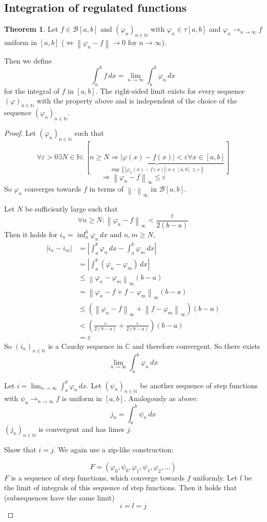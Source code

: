 \documentclass[a4paper,landscape,twocolumn]{article}
\theoremstyle{definition}
\newtheorem{theorem}{Theorem}
\newcommand\set[1]{\left\{#1\right\}}
\newcommand\abs[1]{\left|#1\right|}
\newcommand\seq[1]{{\left(#1\right)}_{n \in \mathbb N}}
\newcommand\reg{\mathcal B}
\newcommand\norm[1]{\left\|#1\right\|}
\begin{document}
\subsection{Integration of regulated functions}
%
\begin{theorem}
  Let $f \in \reg[a,b]$ and $\seq{\varphi_n}$ with $\varphi_n \in \tau[a,b]$ and $\varphi_n \to_{n\to\infty} f$
  uniform in $[a,b]$ ($\Leftrightarrow \norm{\varphi_n - f} \to 0$ for $n \to \infty$).

  Then we define
  \[ \int_a^b f\, dx = \lim_{n\to\infty} \int_a^b \varphi_n \, dx \]
  for the integral of $f$ in $[a,b]$.
  The right-sided limit exists for every sequence $\seq{\varphi}$ with the property above
  and is independent of the choice of the sequence $\seq{\varphi_n}$.
\end{theorem}
\begin{proof}
  Let $\seq{\varphi_n}$ such that
  \[
    \forall \varepsilon > 0 \exists N \in \mathbb N:
    [\underbrace{n \geq N \Rightarrow \abs{\varphi(x) - f(x)} < \varepsilon \forall x \in [a,b]}_{\sup\set{\abs{\varphi_n(x) - f(x)}: x \in [a,b] \leq \varepsilon}}]
  \] \[
    \Rightarrow \norm{\varphi_n - f}_\infty \leq \varepsilon
  \]
  So $\varphi_n$ converges towards $f$ in terms of $\norm{\cdot}_\infty$ in $\reg[a,b]$.

  Let $N$ be sufficiently large such that
  \[ \forall n \geq N: \norm{\varphi_n - f}_\infty < \frac\varepsilon{2(b-a)} \]
  Then it holds for $i_n = \inf_a^b \varphi_n \, dx$ and $n,m \geq N$,
  \begin{align*}
    \abs{i_n - i_m}
      &= \abs{\int_a^b \varphi_n\,dx - \int_a^b \varphi_m\,dx} \\
      &= \abs{\int_a^b (\varphi_n - \varphi_m) \, dx} \\
      &\leq \norm{\varphi_n - \varphi_m}_\infty (b-a) \\
      &= \norm{\varphi_n - f + f - \varphi_m}_\infty (b-a) \\
      &\leq (\norm{\varphi_n - f}_\infty + \norm{f - \varphi_m}_\infty) (b - a) \\
      &< \left(\frac{\varepsilon}{2(b-a)} + \frac{\varepsilon}{2(b - a)}\right)(b - a) \\
      &= \varepsilon
  \end{align*}
  So $\seq{i_n}$ is a Cauchy sequence in $\mathbb C$ and therefore convergent.
  So there exists
  \[ \lim_{n\to\infty} \int_a^b \varphi_n \, dx \]

  Let $i = \lim_{n\to\infty} \int_a^b \varphi_n \, dx$.
  Let $\seq{\psi_n}$ be another sequence of step functions with
  $\psi_n \to_{n\to\infty} f$ is uniform in $[a,b]$.
  Analogously as above:
  \[ j_n = \int_a^b \psi_n \, dx \]
  $\seq{j_n}$ is convergent and has limes $j$.

  Show that $i = j$. We again use a zip-like construction:

  \[ F = (\varphi_0, \psi_0, \varphi_1, \psi_1, \varphi_2, \ldots) \]
  $F$ is a sequence of step functions, which converge towards $f$ uniformly.
  Let $l$ be the limit of integrals of this sequence of step functions.
  Then it holds that (subsequences have the same limit)
  \[ i = l = j \]
\end{proof}
\end{document}
